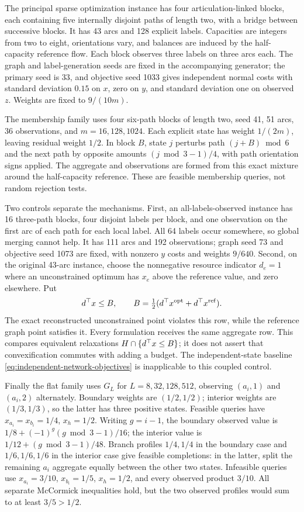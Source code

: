 The principal sparse optimization instance has four articulation-linked
blocks, each containing five internally disjoint paths of length two,
with a bridge between successive blocks. It has 43 arcs and 128 explicit
labels. Capacities are integers from two to eight, orientations vary, and
balances are induced by the half-capacity reference flow. Each block observes
three labels on three arcs each. The graph and label-generation seeds are
fixed in the accompanying generator; the primary seed is 33, and objective
seed 1033 gives independent normal costs with standard deviation $0.15$
on $x$, zero on $y$, and standard deviation one on observed $z$.
Weights are fixed to $9/(10m)$.

The membership family uses four six-path blocks of length two, seed 41,
51 arcs, 36 observations, and $m=16,128,1024$. Each explicit state has
weight $1/(2m)$, leaving residual weight $1/2$. In block $B$, state
$j$ perturbs path $(j+B)\bmod6$ and the next path by opposite amounts
$(j\bmod3-1)/4$, with path orientation signs applied. The aggregate
and observations are formed from this exact mixture around the half-capacity
reference. These are feasible membership queries, not random rejection tests.

Two controls separate the mechanisms. First, an all-labels-observed instance
has 16 three-path blocks, four disjoint labels per block, and one observation
on the first arc of each path for each local label. All 64 labels occur
somewhere, so global merging cannot help. It has 111 arcs and 192 observations;
graph seed 73 and objective seed 1073 are fixed, with nonzero $y$ costs and
weights $9/640$. Second, on the original 43-arc instance, choose the
nonnegative resource indicator $d_e=1$ where an unconstrained optimum has
$x_e$ above the reference value, and zero elsewhere. Put
\[
 d^\top x\le B,\qquad
 B=\tfrac12(d^\top x^{\rm opt}+d^\top x^{\rm ref}).
\]
The exact reconstructed unconstrained point violates this row, while the
reference graph point satisfies it. Every formulation receives the same
aggregate row. This compares equivalent relaxations $H\cap\{d^\top x\le B\}$;
it does not assert that convexification commutes with adding a budget.
The independent-state baseline \eqref{eq:independent-network-objectives}
is inapplicable to this coupled control.

Finally the flat family uses $G_L$ for $L=8,32,128,512$, observing
$(a_i,1)$ and $(a_i,2)$ alternately. Boundary weights are $(1/2,1/2)$;
interior weights are $(1/3,1/3)$, so the latter has three positive
states. Feasible queries have $x_{a_i}=x_{b_i}=1/4$, $x_h=1/2$.
Writing $g=i-1$, the boundary observed value is
$1/8+(-1)^g(g\bmod3-1)/16$; the interior value is
$1/12+(g\bmod3-1)/48$. Branch profiles $1/4,1/4$ in the boundary
case and $1/6,1/6,1/6$ in the interior case give feasible completions:
in the latter, split the remaining $a_i$ aggregate equally between
the other two states. Infeasible queries use
$x_{a_i}=3/10$, $x_{b_i}=1/5$, $x_h=1/2$, and every observed
product $3/10$. All separate McCormick inequalities hold, but the
two observed profiles would sum to at least $3/5>1/2$.

